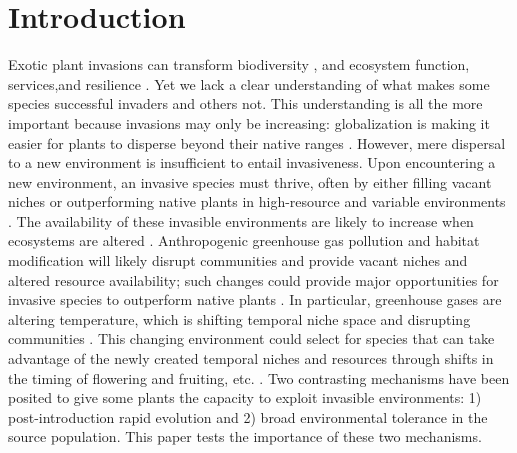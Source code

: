 \documentclass[12pt]{article}\usepackage[]{graphicx}\usepackage[]{color}
\begin{document}
	\section{Introduction}
	Exotic plant invasions  can transform biodiversity \parencite{Bellard2016,Clavero2005,Walker1997}, and ecosystem function, services,and resilience \parencite{Daehler1999,Daehler1994,Ehrenfeld2003,Wilcove1998,Pejchar2009,Pimentel2005,Pysek2010,OTA1993,Mack2000,Levine2003}.  Yet we lack a clear understanding of what makes some species successful invaders and others not. This understanding is all the more important because invasions may only be increasing: globalization is making it easier for plants to disperse beyond their native ranges \parencite{Helmus2014,McKinney1999,Pysek2002,Vitousek1996,Wittenberg2001}. However, mere dispersal to a new environment is insufficient to entail invasiveness. Upon encountering a new environment, an invasive species must thrive, often by either filling vacant niches \parencite{Elton1958} or outperforming native plants in high-resource and variable environments \parencite{Davis2001,Daehler2003}. The availability of these invasible environments are likely to increase when ecosystems are altered \parencite{Tilman2001}. Anthropogenic greenhouse gas pollution and  habitat modification will likely disrupt communities and provide vacant niches and altered resource availability; such changes could provide major opportunities for invasive species to outperform native plants \parencite{Blois2013}. In particular, greenhouse gases are altering temperature, which is shifting temporal niche space and disrupting communities \parencite{Inouye2008,Harte2015}. This changing environment could select for species that can take advantage of the newly created temporal niches and resources through shifts in the timing of flowering and fruiting, etc. \parencite{Franks2007}. Two contrasting mechanisms have been posited to give some plants the capacity to exploit invasible environments: 1) post-introduction rapid evolution and 2) broad environmental tolerance in the source population. This paper tests the importance of these two mechanisms. 
\end{document}

